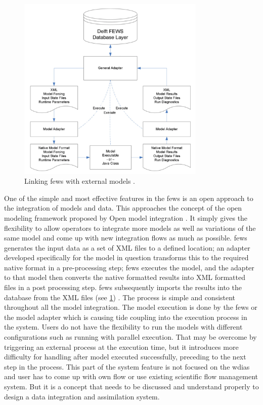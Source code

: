 \begin{figure}[htp]
    \centering
    \includegraphics[width=0.8\textwidth]{lit/fews/Linking-Delft-FEWS-with-external-models-The-fi-gure-shows-the-fl-ow-of-data-through-XML_W640.png}
    \caption[Linking \acrshort{fews} with external models]{Linking \acrshort{fews} with external models \cite{Werner2013TheSystem}.}
    \label{fi:fews_general_adapter}
\end{figure}
One of the simple and most effective features in the \acrshort{fews} is an open approach to the integration of models and data. This approaches the concept of the open modeling framework proposed by Open model integration \cite{Kokkonen2003InterfacingXML}. It simply gives the flexibility to allow operators to integrate more models as well as variations of the same model and come up with new integration flows as much as possible.
\acrshort{fews} generates the input data as a set of XML files to a defined location; an adapter developed specifically for the model in question transforms this to the required native format in a pre-processing step; \acrshort{fews} executes the model, and the adapter to that model then converts the native formatted results into XML formatted files in a post processing step. \acrshort{fews} subsequently imports the results into the database from the XML files (see \cref{fi:fews_general_adapter}) \cite{Werner2013TheSystem}. The process is simple and consistent throughout all the model integration. The model execution is done by the \acrshort{fews} or the model adapter which is causing tide coupling into the execution process in the system. Users do not have the flexibility to run the models with different configurations such as running with parallel execution. That may be overcome by triggering an external process at the execution time, but it introduces more difficulty for handling after model executed successfully, preceding to the next step in the process. This part of the system feature is not focused on the \acrshort{wdias} and user has to come up with own flow or use existing scientific flow management system. But it is a concept that needs to be discussed and understand properly to design a data integration and assimilation system.

